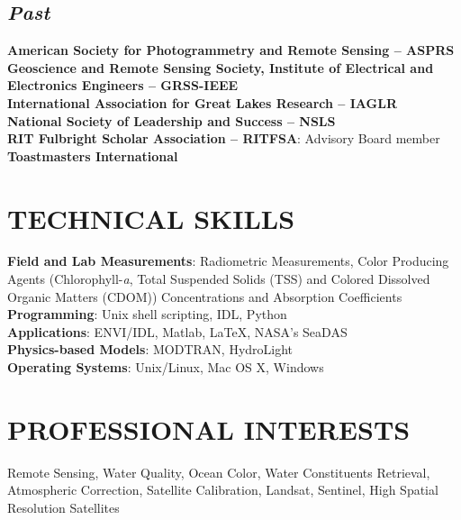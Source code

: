 \documentclass[11pt]{res}
\begin{document}
\begin{resume}
\subsection{\it Past}
\vspace{-0.2in}
{\bf American Society for Photogrammetry and Remote Sensing -- ASPRS}
\vspace{0.1in}\\
{\bf Geoscience and Remote Sensing Society, Institute of Electrical and Electronics Engineers -- GRSS-IEEE}
\vspace{0.1in}\\
{\bf International Association for Great Lakes Research -- IAGLR}
\vspace{0.1in}\\
{\bf National Society of Leadership and Success -- NSLS}
\vspace{0.1in}\\
{\bf RIT Fulbright Scholar Association -- RITFSA}: Advisory Board member
\vspace{0.1in}\\
{\bf Toastmasters International}

\section{TECHNICAL SKILLS}
\vspace{0.1in}
{\bf Field and Lab Measurements}: Radiometric Measurements, Color Producing Agents (Chlorophyll-{\it a}, Total Suspended Solids (TSS) and Colored Dissolved Organic Matters (CDOM)) Concentrations and Absorption Coefficients
\vspace{0.1in}\\
{\bf Programming}: Unix shell scripting, IDL, Python
\vspace{0.1in}\\
{\bf Applications}: ENVI/IDL, Matlab, LaTeX, NASA's SeaDAS
\vspace{0.1in}\\
{\bf Physics-based Models}: MODTRAN, HydroLight
\vspace{0.1in}\\
{\bf Operating Systems}: Unix/Linux, Mac OS X, Windows\\

\vspace{-0.1in}
\section{PROFESSIONAL INTERESTS}
\vspace{0.1in}
Remote Sensing, Water Quality, Ocean Color, Water Constituents Retrieval, Atmospheric Correction, Satellite Calibration, Landsat, Sentinel, High Spatial Resolution Satellites\\


\end{resume}
\end{document}
